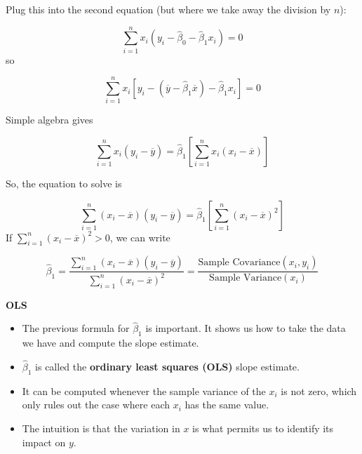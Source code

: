 \documentclass[notes=show]{beamer}
\begin{document}
\begin{frame}[plain]
 Plug this into the second equation (but where we take away the division by $n$):

 \begin{equation}
  \sum_{i=1}^{n}x_{i}(y_{i}-\hat{\beta}_{0}-\hat{\beta}_{1}x_{i})=0
 \end{equation}
so

 \begin{equation}
  \sum_{i=1}^{n}x_{i}[y_{i}-(\overline{y}-\hat{\beta}_{1}\overline{x})-\hat{\beta}_{1}x_{i}]=0
 \end{equation}

 Simple algebra gives

 \begin{equation}
  \sum_{i=1}^{n}x_{i}(y_{i}-\overline{y})=\hat{\beta}_{1}\left[
  \sum_{i=1}^{n}x_{i}(x_{i}-\overline{x})\right]
 \end{equation}
\end{frame}

\begin{frame}[plain]

So, the equation to solve is

 \begin{equation}
  \sum_{i=1}^{n}(x_{i}-\overline{x})(y_{i}-\overline{y})=\hat{\beta}_{1}\left[\sum_{i=1}^{n}(x_{i}-\overline{x})^{2}\right]
 \end{equation}
 \linebreak
 If $\sum_{i=1}^{n}(x_{i}-\overline{x})^{2}>0$, we can write

 \begin{equation}
\hat{\beta}_{1}=\frac{\sum_{i=1}^{n}(x_{i}-\overline{x})(y_{i}-\overline{y})}{\sum_{i=1}^{n}(x_{i}-\overline{x})^{2}}=\frac{\text{Sample Covariance}(x_{i},y_{i})}{\text{Sample Variance}(x_{i})}
 \end{equation}
\end{frame}

\begin{frame}[plain]
\begin{center}
\textbf{OLS}
\end{center}

 \begin{itemize}
  \item The previous formula for $\hat{\beta}_{1}$ is important. It shows us how to take the data we have and compute the slope estimate. 
  \item $\hat{\beta}_{1}$ is called the \textbf{ordinary least squares (OLS)} slope estimate.

  \item It can be computed whenever the sample variance of the $x_{i}$ is not zero, which only rules out the case where each $x_{i}$ has the same value. 
  \item The intuition is that the variation in $x$ is what permits us to identify its impact on $y$. 

 \end{itemize}
\end{frame}
\end{document}

